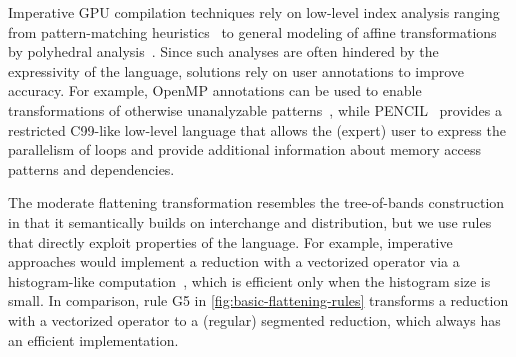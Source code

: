 Imperative GPU compilation techniques rely on low-level index
analysis ranging from pattern-matching
heuristics~\cite{InformalTiling,Lime} to general modeling
of affine transformations by polyhedral analysis~\cite{PolyPluto2,PolyhedralOpt}.
%
Since such analyses are often hindered by the expressivity of the
language, solutions rely on user annotations to improve accuracy. For
example, OpenMP annotations can be used to enable transformations of
otherwise unanalyzable patterns~\cite{chatarasi2015polyhedral}, while
PENCIL~\cite{PencilPACT} provides a restricted C99-like low-level
language that allows the (expert) user to express the parallelism of
loops and provide additional information about memory access patterns
and dependencies.

The moderate flattening transformation resembles the tree-of-bands
construction~\cite{PolyPluto2} in that it semantically builds on
interchange and distribution, but we use rules that directly exploit
properties of the language. For example, imperative approaches would
implement a reduction with a vectorized operator via a histogram-like
computation~\cite{RedPencil}, which is efficient only when the
histogram size is small.  In comparison, rule G5 in
\cref{fig:basic-flattening-rules} transforms a reduction with a
vectorized operator to a (regular) segmented reduction, which always
has an efficient implementation.

